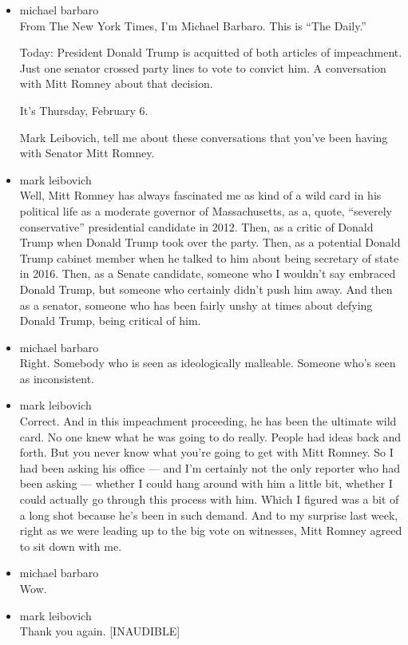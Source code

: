 \begin{itemize}
\item
  michael barbaro\\
  From The New York Times, I'm Michael Barbaro. This is ``The Daily.''

  Today: President Donald Trump is acquitted of both articles of
  impeachment. Just one senator crossed party lines to vote to convict
  him. A conversation with Mitt Romney about that decision.

  It's Thursday, February 6.

  Mark Leibovich, tell me about these conversations that you've been
  having with Senator Mitt Romney.
\item
  mark leibovich\\
  Well, Mitt Romney has always fascinated me as kind of a wild card in
  his political life as a moderate governor of Massachusetts, as a,
  quote, ``severely conservative'' presidential candidate in 2012. Then,
  as a critic of Donald Trump when Donald Trump took over the party.
  Then, as a potential Donald Trump cabinet member when he talked to him
  about being secretary of state in 2016. Then, as a Senate candidate,
  someone who I wouldn't say embraced Donald Trump, but someone who
  certainly didn't push him away. And then as a senator, someone who has
  been fairly unshy at times about defying Donald Trump, being critical
  of him.
\item
  michael barbaro\\
  Right. Somebody who is seen as ideologically malleable. Someone who's
  seen as inconsistent.
\item
  mark leibovich\\
  Correct. And in this impeachment proceeding, he has been the ultimate
  wild card. No one knew what he was going to do really. People had
  ideas back and forth. But you never know what you're going to get with
  Mitt Romney. So I had been asking his office --- and I'm certainly not
  the only reporter who had been asking --- whether I could hang around
  with him a little bit, whether I could actually go through this
  process with him. Which I figured was a bit of a long shot because
  he's been in such demand. And to my surprise last week, right as we
  were leading up to the big vote on witnesses, Mitt Romney agreed to
  sit down with me.
\item
  michael barbaro\\
  Wow.
\item
  mark leibovich\\
  Thank you again. {[}INAUDIBLE{]}
\end{itemize}

